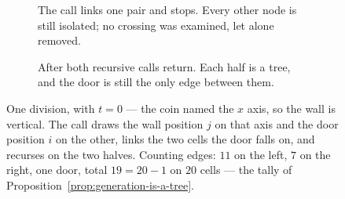 \begin{figure}[htbp]
  \centering
  \begin{subfigure}[b]{0.47\textwidth}\centering
    \caption{The call links one pair and stops. Every other node is still
    isolated; no crossing was examined, let alone removed.}
    \label{fig:division-adds}
  \end{subfigure}\hfill
  \begin{subfigure}[b]{0.47\textwidth}\centering
    \caption{After both recursive calls return. Each half is a tree, and the
    door is still the only edge between them.}
    \label{fig:division-recursed}
  \end{subfigure}
  \caption{One division, with $t=0$ --- the coin named the $x$ axis, so the wall
  is vertical. The call draws the wall position $j$ on that axis and the door
  position $i$ on the other, links the two cells the door falls on, and recurses
  on the two halves. Counting edges: $11$ on the left, $7$ on the right, one
  door, total $19=20-1$ on $20$ cells --- the tally of
  Proposition~\ref{prop:generation-is-a-tree}.}
  \label{fig:one-division-step}
\end{figure}
